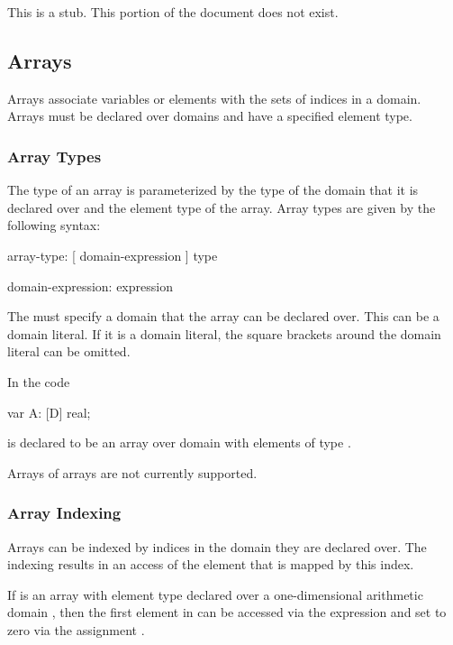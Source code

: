 This is a stub.  This portion of the document does not exist.

\subsection{Arrays}
\label{Arrays}

Arrays associate variables or elements with the sets of indices in a
domain.  Arrays must be declared over domains and have a specified
element type.

\subsubsection{Array Types}
\label{Array_Types}

The type of an array is parameterized by the type of the domain that
it is declared over and the element type of the array.  Array types
are given by the following syntax:
\begin{syntax}
array-type:
  [ domain-expression ] type

domain-expression:
  expression
\end{syntax}
The  must specify a domain that the array can
be declared over.  This can be a domain literal.  If it is a domain
literal, the square brackets around the domain literal can be omitted.

\begin{example}
In the code
\begin{chapel}
var A: [D] real;
\end{chapel}
 is declared to be an array over domain  with
elements of type .
\end{example}

\begin{implementation}
Arrays of arrays are not currently supported.
\end{implementation}

\subsubsection{Array Indexing}
\label{Array_Indexing}

Arrays can be indexed by indices in the domain they are declared over.
The indexing results in an access of the element that is mapped by
this index.

\begin{example}
If  is an array with element type  declared over a
one-dimensional arithmetic domain \chpl{[1..n]}, then the first
element in  can be accessed via the expression  and
set to zero via the assignment .
\end{example}

